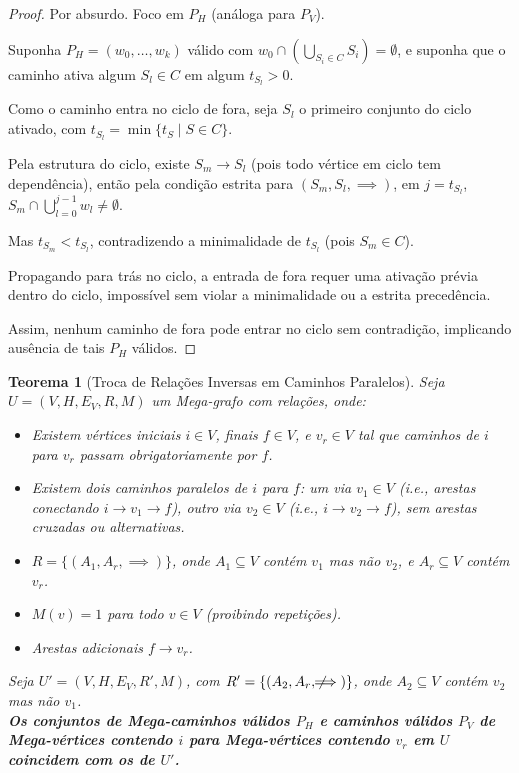 \documentclass{article}
\newtheorem{theorem}{Teorema}
\begin{document}
\begin{proof}
Por absurdo. Foco em \( P_H \) (análoga para \( P_V \)).

Suponha \( P_H = (w_0, \dots, w_k) \) válido com \( w_0 \cap \left( \bigcup_{S_i \in C} S_i \right) = \emptyset \), e suponha que o caminho ativa algum \( S_l \in C \) em algum \( t_{S_l} > 0 \).

Como o caminho entra no ciclo de fora, seja \( S_l \) o primeiro conjunto do ciclo ativado, com \( t_{S_l} = \min \{ t_S \mid S \in C \} \).

Pela estrutura do ciclo, existe \( S_m \to S_l \) (pois todo vértice em ciclo tem dependência), então pela condição estrita para \( (S_m, S_l, \implies) \), em \( j = t_{S_l} \), \( S_m \cap \bigcup_{l=0}^{j-1} w_l \neq \emptyset \).

Mas \( t_{S_m} < t_{S_l} \), contradizendo a minimalidade de \( t_{S_l} \) (pois \( S_m \in C \)).

Propagando para trás no ciclo, a entrada de fora requer uma ativação prévia dentro do ciclo, impossível sem violar a minimalidade ou a estrita precedência.

Assim, nenhum caminho de fora pode entrar no ciclo sem contradição, implicando ausência de tais \( P_H \) válidos.
\end{proof}

\newpage
\begin{theorem}[Troca de Relações Inversas em Caminhos Paralelos]
\hfill

Seja \( U = (V, H, E_V, R, M) \) um Mega-grafo com relações, onde:

\begin{itemize}
    \item Existem vértices iniciais \( i \in V \), finais \( f \in V \), e \( v_r \in V \) tal que caminhos de \( i \) para \( v_r \) passam obrigatoriamente por \( f \).
    \item Existem dois caminhos paralelos de \( i \) para \( f \): um via \( v_1 \in V \) (i.e., arestas conectando \( i \to v_1 \to f \)), outro via \( v_2 \in V \) (i.e., \( i \to v_2 \to f \)), sem arestas cruzadas ou alternativas.
    \item \( R = \{ (A_1, A_r, \implies) \} \), onde \( A_1 \subseteq V \) contém \( v_1 \) mas não \( v_2 \), e \( A_r \subseteq V \) contém \( v_r \).
    \item \( M(v) = 1 \) para todo \( v \in V \) (proibindo repetições).
    \item Arestas adicionais \( f \to v_r \).
\end{itemize}

Seja \( U' = (V, H, E_V, R', M) \), com \( R' = \{ (A_2, A_r, \not\!\!\!\implies) \} \), onde \( A_2 \subseteq V \) contém \( v_2 \) mas não \( v_1 \).
\\

\textbf{Os conjuntos de Mega-caminhos válidos \( P_H \) e caminhos válidos \( P_V \) de Mega-vértices contendo \( i \) para Mega-vértices contendo \( v_r \) em \( U \) coincidem com os de \( U' \).}
\end{theorem}
\end{document}
